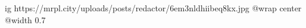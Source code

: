  
 
 
 
 

\ifcmt
  ig https://mrpl.city/uploads/posts/redactor/6em3nldhiibeq8kx.jpg
  @wrap center
  @width 0.7
\fi
